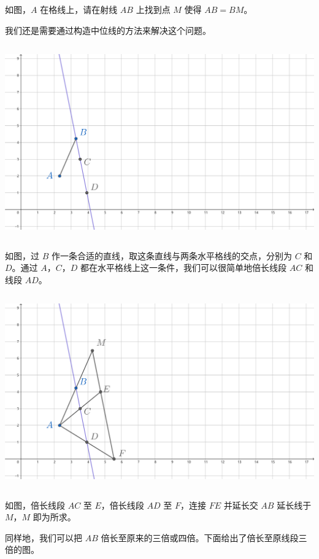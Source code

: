 \documentclass[UTF8]{article}
\begin{document}
如图，\(A\) 在格线上，请在射线 \(AB\) 上找到点 \(M\) 使得 \(AB = BM\)。

我们还是需要通过构造中位线的方法来解决这个问题。

\includegraphics[width=5.76806in,height=3.27847in]{media/image36.png}

如图，过 \(B\) 作一条合适的直线，取这条直线与两条水平格线的交点，分别为
\(C\) 和 \(D\)。通过 \(A\)，\(C\)，\(D\)
都在水平格线上这一条件，我们可以很简单地倍长线段 \(AC\) 和线段 \(AD\)。

\includegraphics[width=5.76806in,height=3.27847in]{media/image37.png}

如图，倍长线段 \(AC\) 至 \(E\)，倍长线段 \(AD\) 至 \(F\)，连接 \(FE\)
并延长交 \(AB\) 延长线于 \(M\)，\(M\) 即为所求。

同样地，我们可以把 \(AB\)
倍长至原来的三倍或四倍。下面给出了倍长至原线段三倍的图。
\end{document}
